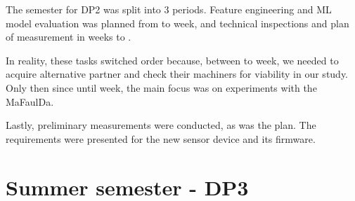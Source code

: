 The semester for DP2 was split into 3 periods. Feature engineering and ML model evaluation was planned from  to  week, and technical inspections and plan of measurement in weeks  to .

In reality, these tasks switched order because, between  to  week, we needed to acquire alternative partner and check their machiners for viability in our study. Only then since  until  week, the main focus was on experiments with the MaFaulDa. 

Lastly, preliminary measurements were conducted, as was the plan. The requirements were presented for the new sensor device and its firmware.
\clearpage
\newpage

\section{Summer semester - DP3}
